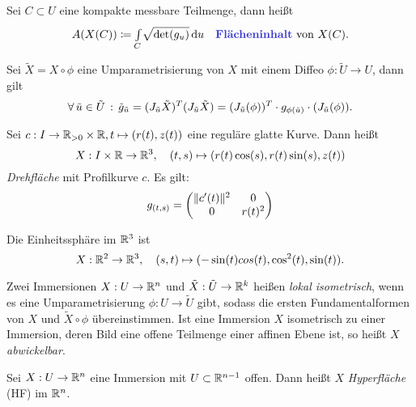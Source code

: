 \documentclass{cheat-sheet}
\begin{document}
\begin{defn}
  Sei $C \subset U$ eine kompakte messbare Teilmenge, dann heißt
  \[
    A(X(C)) \coloneqq \Int{C}{}{ \sqrt{\det(g_u)} }{u}
    \quad \text{\emph{Flächeninhalt} von $X(C)$.}
  \]
\end{defn}

\begin{satz}
  Sei $\tilde{X} = X \circ \phi$ eine Umparametrisierung von $X$ mit einem Diffeo $\phi : \tilde{U} \to U$, dann gilt
  \[ \forall \, {\tilde{u} \in \tilde{U}} \,:\, \tilde{g}_{\tilde{u}} = (J_{\tilde{u}} \tilde{X})^T (J_{\tilde{u}} \tilde{X}) = (J_{\tilde{u}}(\phi))^T \cdot g_{\phi(\tilde{u})} \cdot (J_{\tilde{u}}(\phi)). \]
\end{satz}

\begin{bsp}[Drehfläche]
  Sei $c : I \to \mathbb{R}_{> 0} \times \mathbb{R}, t \mapsto (r(t), z(t))$ eine reguläre glatte Kurve. Dann heißt
  \[ X : I \times \mathbb{R} \to \mathbb{R}^3, \quad (t, s) \mapsto (r(t) \cos(s), r(t) \sin(s), z(t)) \]
  \emph{Drehfläche} mit Profilkurve $c$. Es gilt:
  \[ g_{(t, s)} = \begin{pmatrix} \lVert c'(t)\rVert^2 & 0 \\ 0 & r(t)^2 \end{pmatrix} \]
\end{bsp}

\begin{bsp}[Kugelfläche] Die Einheitssphäre im $\mathbb{R}^3$ ist
\[ X : \mathbb{R}^2 \to \mathbb{R}^3, \quad (s, t) \mapsto (- \sin(t) cos(t), \cos^2(t), \sin(t)). \]
\end{bsp}

\begin{defn}
  Zwei Immersionen $X : U \to \mathbb{R}^n$ und $\tilde{X} : \tilde{U} \to \mathbb{R}^k$ heißen \emph{lokal isometrisch}, wenn es eine Umparametrisierung $\phi : U \to \tilde{U}$ gibt, sodass die ersten Fundamentalformen von $X$ und $\tilde{X} \circ \phi$ übereinstimmen. Ist eine Immersion $X$ isometrisch zu einer Immersion, deren Bild eine offene Teilmenge einer affinen Ebene ist, so heißt $X$ \emph{abwickelbar}.
\end{defn}



\begin{defn}
  Sei $X : U \to \mathbb{R}^n$ eine Immersion mit $U \subset \mathbb{R}^{n-1}$ offen. Dann heißt $X$ \emph{Hyperfläche} (HF) im $\mathbb{R}^n$.
\end{defn}
\end{document}
